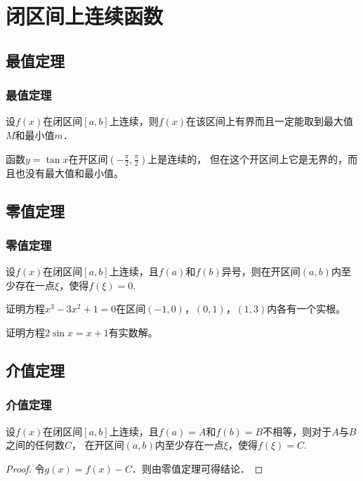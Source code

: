 \documentclass[14pt,notheorems,leqno,xcolor={rgb}]{beamer} %
\begin{document}
\section{闭区间上连续函数}

\subsection{最值定理}

\begin{frame}
\frametitle{最值定理}
\begin{theorem}
设$f(x)$在闭区间$[a,b]$上连续，则$f(x)$在该区间上有界而且一定能取到最大值$M$和最小值$m$．
\end{theorem}
\vpause
\begin{remark*}
函数$y=\tan x$在开区间$\left(-\frac\pi2,\frac\pi2\right)$上是连续的，
但在这个开区间上它是无界的，而且也没有最大值和最小值。
\end{remark*}
\end{frame}

\subsection{零值定理}

\begin{frame}
\frametitle{零值定理}
\begin{theorem}
设$f(x)$在闭区间$[a,b]$上连续，且$f(a)$和$f(b)$异号，则在开区间$(a,b)$内至少存在一点$\xi$，使得$f(\xi)=0$.
\end{theorem}
\vpause
\begin{example}
证明方程$x^3-3x^2+1=0$在区间$(-1,0)$，$(0,1)$，$(1,3)$内各有一个实根。
\end{example}
\vpause
\begin{example}
证明方程$2\sin x=x+1$有实数解。
\end{example}
\end{frame}

\subsection{介值定理}

\begin{frame}
\frametitle{介值定理}
\begin{theorem}
设$f(x)$在闭区间$[a,b]$上连续，且$f(a)=A$和$f(b)=B$不相等，则对于$A$与$B$之间的任何数$C$，
在开区间$(a,b)$内至少存在一点$\xi$，使得$f(\xi)=C$.
\end{theorem}
\pause
\begin{proof}
令$g(x)=f(x)-C$．则由零值定理可得结论．
\end{proof}
\end{frame}
\end{document}
